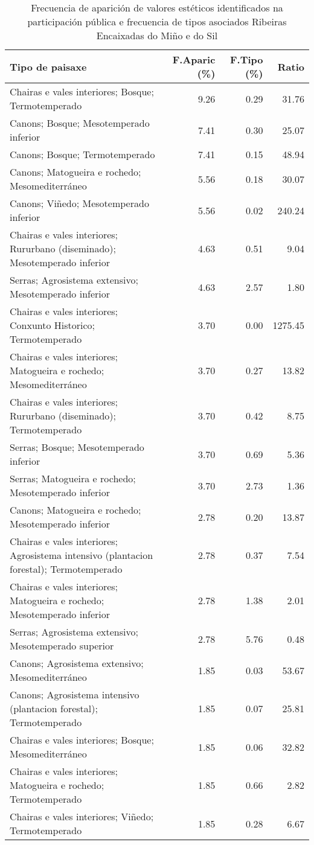\begin{table}[p]
\centering
\caption{Frecuencia de aparición de valores estéticos identificados na participación pública e frecuencia de tipos asociados Ribeiras Encaixadas do Miño e do Sil} 
\label{vsixotest4}
\begin{tabular}{lrrr}
  \hline
Tipo de paisaxe & F.Aparic (\%) & F.Tipo (\%) & Ratio \\ 
  \hline
Chairas e vales interiores; Bosque; Termotemperado & 9.26 & 0.29 & 31.76 \\ 
  Canons; Bosque; Mesotemperado inferior & 7.41 & 0.30 & 25.07 \\ 
  Canons; Bosque; Termotemperado & 7.41 & 0.15 & 48.94 \\ 
  Canons; Matogueira e rochedo; Mesomediterráneo & 5.56 & 0.18 & 30.07 \\ 
  Canons; Viñedo; Mesotemperado inferior & 5.56 & 0.02 & 240.24 \\ 
  Chairas e vales interiores; Rururbano (diseminado); Mesotemperado inferior & 4.63 & 0.51 & 9.04 \\ 
  Serras; Agrosistema extensivo; Mesotemperado inferior & 4.63 & 2.57 & 1.80 \\ 
  Chairas e vales interiores; Conxunto Historico; Termotemperado & 3.70 & 0.00 & 1275.45 \\ 
  Chairas e vales interiores; Matogueira e rochedo; Mesomediterráneo & 3.70 & 0.27 & 13.82 \\ 
  Chairas e vales interiores; Rururbano (diseminado); Termotemperado & 3.70 & 0.42 & 8.75 \\ 
  Serras; Bosque; Mesotemperado inferior & 3.70 & 0.69 & 5.36 \\ 
  Serras; Matogueira e rochedo; Mesotemperado inferior & 3.70 & 2.73 & 1.36 \\ 
  Canons; Matogueira e rochedo; Mesotemperado inferior & 2.78 & 0.20 & 13.87 \\ 
  Chairas e vales interiores; Agrosistema intensivo (plantacion forestal); Termotemperado & 2.78 & 0.37 & 7.54 \\ 
  Chairas e vales interiores; Matogueira e rochedo; Mesotemperado inferior & 2.78 & 1.38 & 2.01 \\ 
  Serras; Agrosistema extensivo; Mesotemperado superior & 2.78 & 5.76 & 0.48 \\ 
  Canons; Agrosistema extensivo; Mesomediterráneo & 1.85 & 0.03 & 53.67 \\ 
  Canons; Agrosistema intensivo (plantacion forestal); Termotemperado & 1.85 & 0.07 & 25.81 \\ 
  Chairas e vales interiores; Bosque; Mesomediterráneo & 1.85 & 0.06 & 32.82 \\ 
  Chairas e vales interiores; Matogueira e rochedo; Termotemperado & 1.85 & 0.66 & 2.82 \\ 
  Chairas e vales interiores; Viñedo; Termotemperado & 1.85 & 0.28 & 6.67 \\ 
   \hline
\end{tabular}
\end{table}
